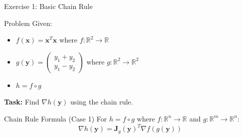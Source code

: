 \documentclass[aspectratio=1610]{beamer}
\begin{document}
\begin{frame}{Exercise 1: Basic Chain Rule}
  \begin{block}{Problem}
    Given:
    \begin{itemize}
      \item $f(\mathbf{x}) = \mathbf{x}^T\mathbf{x}$ where $f: \mathbb{R}^2 \to \mathbb{R}$
      \item $g(\mathbf{y}) = \begin{pmatrix} y_1 + y_2 \\ y_1 - y_2 \end{pmatrix}$ where $g: \mathbb{R}^2 \to \mathbb{R}^2$
      \item $h = f \circ g$
    \end{itemize}
    \vspace{0.3cm}
    \textbf{Task:} Find $\nabla h(\mathbf{y})$ using the chain rule.
  \end{block}
  
  \begin{block}{Chain Rule Formula (Case 1)}
    For $h = f \circ g$ where $f: \mathbb{R}^n \to \mathbb{R}$ and $g: \mathbb{R}^m \to \mathbb{R}^n$:
    $$\nabla h(\mathbf{y}) = \mathbf{J}_g(\mathbf{y})^T \nabla f(g(\mathbf{y}))$$
  \end{block}
\end{frame}
\end{document}
